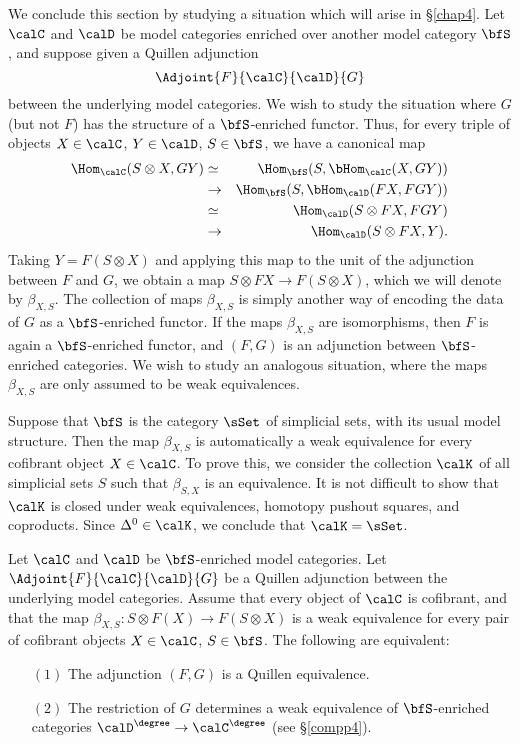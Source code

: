 \begin{Simplicial Categories}
We conclude this section by studying a situation which will arise in \S \ref{chap4}. 
Let $\calC$ and $\calD$ be model categories enriched over another model category $\bfS$, and suppose given a Quillen adjunction $$\Adjoint{F}{\calC}{\calD}{G}$$
between the underlying model categories. We wish to study the situation where $G$ (but not $F$) has the structure of a $\bfS$-enriched functor. Thus, for every triple of objects
$X \in \calC$, $Y \in \calD$, $S \in \bfS$, we have a canonical map
\begin{eqnarray*}
\Hom_{\calC}( S \otimes X, GY) & \simeq & \Hom_{\bfS}( S, \bHom_{\calC}( X, GY) ) \\
& \rightarrow &  \Hom_{\bfS}( S, \bHom_{\calD}(FX, FGY) ) \\
& \simeq & \Hom_{\calD}( S \otimes FX, FGY) \\
& \rightarrow & \Hom_{\calD}( S \otimes FX, Y). \end{eqnarray*}
Taking $Y = F(S \otimes X)$ and applying this map to the unit of the adjunction between
$F$ and $G$, we obtain a map
$S \otimes FX \rightarrow F(S \otimes X)$, which we will denote by $\beta_{X,S}$.
The collection of maps $\beta_{X,S}$ is simply another way of encoding the data of $G$
as a $\bfS$-enriched functor. If the maps $\beta_{X,S}$ are isomorphisms, then
$F$ is again a $\bfS$-enriched functor, and $(F,G)$ is an adjunction between $\bfS$-enriched categories. We wish to study an analogous situation, where the maps $\beta_{X,S}$ are only assumed to be weak equivalences.

\begin{remark}\label{tuccan}
Suppose that $\bfS$ is the category $\sSet$ of simplicial sets, with its usual model structure.
Then the map $\beta_{X,S}$ is automatically a weak equivalence for every cofibrant object
$X \in \calC$. To prove this, we consider the collection $\calK$ of all simplicial sets
$S$ such that $\beta_{S,X}$ is an equivalence. It is not difficult to show that $\calK$ is
closed under weak equivalences, homotopy pushout squares, and coproducts.
Since $\Delta^0 \in \calK$, we conclude that $\calK = \sSet$.
\end{remark}

\begin{proposition}\label{weakcompatequiv}
Let $\calC$ and $\calD$ be $\bfS$-enriched model categories. Let
$\Adjoint{F}{\calC}{\calD}{G}$ be a Quillen adjunction between the underlying model categories.
Assume that every object of $\calC$ is cofibrant,
and that the map $\beta_{X,S}: S \otimes F(X) \rightarrow F(S \otimes X)$ is a weak equivalence for every pair of cofibrant objects $X \in \calC$, $S \in \bfS$. The following are equivalent:
\begin{itemize}
\item[$(1)$] The adjunction $(F,G)$ is a Quillen equivalence.
\item[$(2)$] The restriction of $G$ determines a weak equivalence of $\bfS$-enriched categories
$\calD^{\degree} \rightarrow \calC^{\degree}$ (see \S \ref{compp4}).
\end{itemize}
\end{proposition}


\end{Simplicial Categories}
